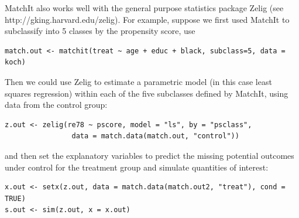 \documentclass[11pt,titlepage]{article}
\begin{document}
MatchIt also works well with the general purpose statistics package
Zelig (see http://gking.harvard.edu/zelig).  For example, suppose
we first used MatchIt to subclassify into 5 classes by the propensity
score, use
\begin{verbatim}
match.out <- matchit(treat ~ age + educ + black, subclass=5, data = koch)
\end{verbatim}
Then we could use Zelig to estimate a parametric model (in this case
least squares regression) within each of the five subclasses defined
by MatchIt, using data from the control group:
\begin{verbatim}
z.out <- zelig(re78 ~ pscore, model = "ls", by = "psclass", 
                data = match.data(match.out, "control"))
\end{verbatim}
and then set the explanatory variables to predict the missing
potential outcomes under control for the treatment group and simulate
quantities of interest:
\begin{verbatim}
x.out <- setx(z.out, data = match.data(match.out2, "treat"), cond = TRUE)
s.out <- sim(z.out, x = x.out)
\end{verbatim}

\baselineskip 

\end{document}
